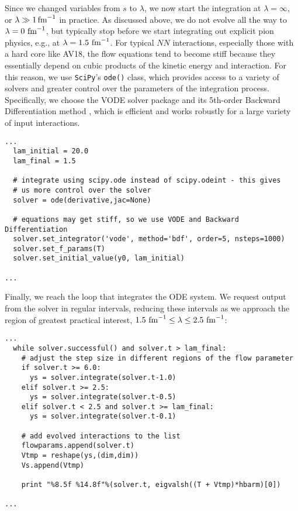 
Since we changed variables from $s$ to $\lambda$, we now start the
integration at $\lambda=\infty$, or $\lambda\gg 1\,\text{fm}^{-1}$ in practice.
As discussed above, we do not evolve all the way to $\lambda=0\,\,\text{fm}^{-1}$,
but typically stop before we start integrating out explicit pion
physics, e.g., at $\lambda=1.5\,\,\text{fm}^{-1}$. For typical $NN$ interactions,
especially those with a hard core like AV18, the flow equations tend
to become stiff because they essentially depend on cubic products of
the kinetic energy and interaction. For this reason, we use \texttt{SciPy}'s
\texttt{ode()} class, which provides access to a variety of solvers
and greater control over the parameters of the integration process.
Specifically, we choose the VODE solver package and its 5th-order 
Backward Differentiation method \cite{Brown:1989wj}, which is 
efficient and works robustly for a large variety of input interactions.

\begin{lstlisting}
...
  lam_initial = 20.0
  lam_final = 1.5

  # integrate using scipy.ode instead of scipy.odeint - this gives
  # us more control over the solver
  solver = ode(derivative,jac=None)

  # equations may get stiff, so we use VODE and Backward Differentiation
  solver.set_integrator('vode', method='bdf', order=5, nsteps=1000)
  solver.set_f_params(T)
  solver.set_initial_value(y0, lam_initial)

...
\end{lstlisting}

Finally, we reach the loop that integrates the ODE system. We request
output from the solver in regular intervals, reducing these intervals
as we approach the region of greatest practical interest, 
$1.5\,\,\text{fm}^{-1}\leq \lambda \leq 2.5\,\,\text{fm}^{-1}$: 

\begin{lstlisting}
...
  while solver.successful() and solver.t > lam_final:
    # adjust the step size in different regions of the flow parameter
    if solver.t >= 6.0:
      ys = solver.integrate(solver.t-1.0)
    elif solver.t >= 2.5:
      ys = solver.integrate(solver.t-0.5)
    elif solver.t < 2.5 and solver.t >= lam_final:
      ys = solver.integrate(solver.t-0.1)

    # add evolved interactions to the list
    flowparams.append(solver.t)
    Vtmp = reshape(ys,(dim,dim))
    Vs.append(Vtmp)

    print "%8.5f %14.8f"%(solver.t, eigvalsh((T + Vtmp)*hbarm)[0])

...
\end{lstlisting}


